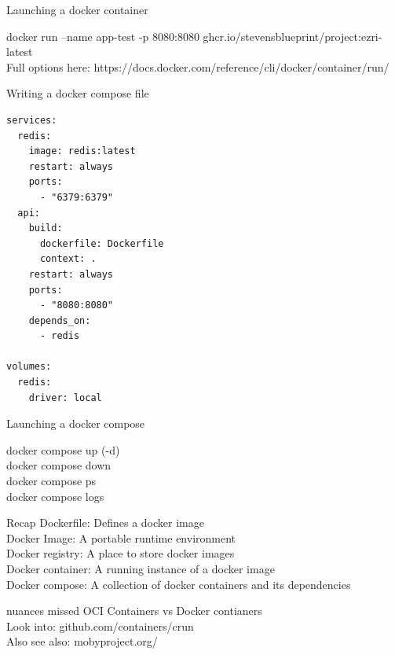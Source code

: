\documentclass{beamer}
\begin{document}
\begin{frame}[fragile]{Launching a docker container}

docker run --name app-test -p 8080:8080
    ghcr.io/stevensblueprint/project:ezri-latest \\
    
    Full options here:
    https://docs.docker.com/reference/cli/docker/container/run/ \\
\end{frame}

\begin{frame}[fragile]{Writing a docker compose file}

    \begin{lstlisting}
services:
  redis:
    image: redis:latest
    restart: always
    ports:
      - "6379:6379"
  api:
    build:
      dockerfile: Dockerfile
      context: .
    restart: always
    ports:
      - "8080:8080"
    depends_on:
      - redis

volumes:
  redis:
    driver: local
    \end{lstlisting}
    
\end{frame}

\begin{frame}[fragile]{Launching a docker compose}

docker compose up (-d) \\
docker compose down \\
docker compose ps \\
docker compose logs \\

\end{frame}

\begin{frame}{Recap}
    Dockerfile: Defines a docker image\\
    Docker Image: A portable runtime environment\\
    Docker registry: A place to store docker images\\
    Docker container: A running instance of a docker image\\
    Docker compose: A collection of docker containers and its dependencies\\
\end{frame}

\begin{frame}{nuances missed}
    OCI Containers vs Docker contianers \\
    Look into: github.com/containers/crun \\
    Also see also: mobyproject.org/ \\

\end{frame}
\end{document}
